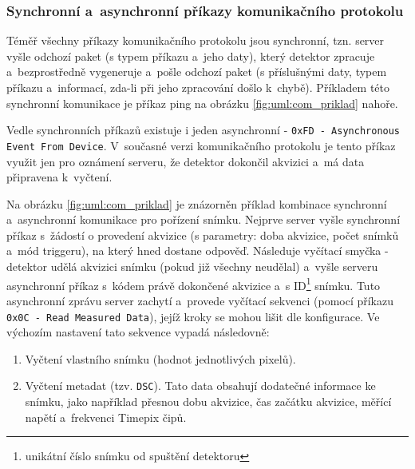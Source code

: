 \subsubsection{Synchronní a~asynchronní příkazy komunikačního protokolu}\label{atlas:com:synchonni_a_asynchonni_prikazy}
Téměř všechny příkazy komunikačního protokolu jsou synchronní, tzn. server vyšle odchozí paket (s typem příkazu a~jeho daty), který detektor zpracuje a~bezprostředně vygeneruje a~pošle odchozí paket (s příslušnými daty, typem příkazu a~informací, zda-li při jeho zpracování došlo k~chybě). Příkladem této synchronní komunikace je příkaz ping na obrázku \ref{fig:uml:com_priklad} nahoře.

Vedle synchronních příkazů existuje i jeden asynchronní - \texttt{0xFD - Asynchronous Event From Device}. V~současné verzi komunikačního protokolu je tento příkaz využit jen pro oznámení serveru, že detektor dokončil akvizici a~má data připravena k~vyčtení.

Na obrázku \ref{fig:uml:com_priklad} je znázorněn příklad kombinace synchronní a~asynchronní komunikace pro pořízení snímku. Nejprve server vyšle synchronní příkaz s~žádostí o provedení akvizice (s parametry: doba akvizice, počet snímků a~mód triggeru), na který hned dostane odpověď. Následuje vyčítací smyčka - detektor udělá akvizici snímku (pokud již všechny neudělal) a~vyšle serveru asynchronní příkaz s~kódem právě dokončené akvizice a~s ID\footnote{unikátní číslo snímku od spuštění detektoru} snímku. Tuto asynchronní zprávu server zachytí a~provede vyčítací sekvenci (pomocí příkazu \texttt{0x0C - Read Measured Data}), jejíž kroky se mohou lišit dle konfigurace. Ve výchozím nastavení tato sekvence vypadá následovně:
\begin{enumerate}
	\item Vyčtení vlastního snímku (hodnot jednotlivých pixelů).
	\item Vyčtení metadat (tzv. \texttt{DSC}). Tato data obsahují dodatečné informace ke snímku, jako například přesnou dobu akvizice, čas začátku akvizice, měřící napětí a~frekvenci Timepix čipů.
\end{enumerate}


